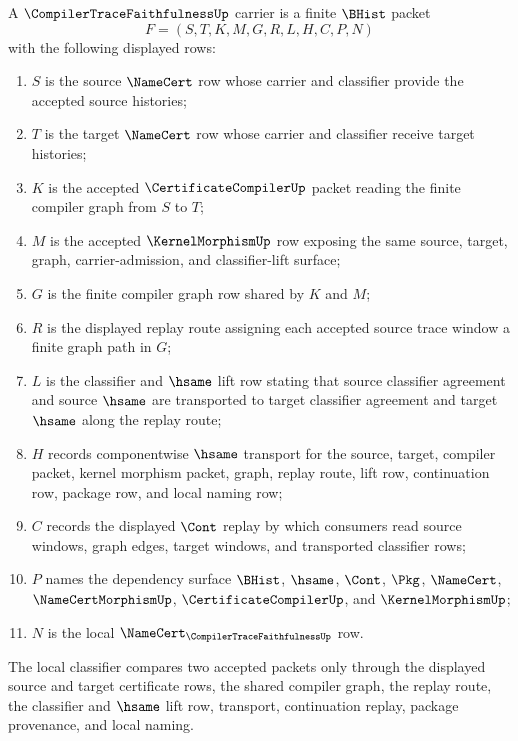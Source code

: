 \begin{definition}
\label{def:compiler-trace-faithfulness-carrier}
A $\CompilerTraceFaithfulnessUp$ carrier is a finite $\BHist$ packet
$$
F=(S,T,K,M,G,R,L,H,C,P,N)
$$
with the following displayed rows:
\begin{enumerate}
\item $S$ is the source $\NameCert$ row whose carrier and classifier provide the accepted source histories;
\item $T$ is the target $\NameCert$ row whose carrier and classifier receive target histories;
\item $K$ is the accepted $\CertificateCompilerUp$ packet reading the finite compiler graph from $S$ to $T$;
\item $M$ is the accepted $\KernelMorphismUp$ row exposing the same source, target, graph, carrier-admission, and classifier-lift surface;
\item $G$ is the finite compiler graph row shared by $K$ and $M$;
\item $R$ is the displayed replay route assigning each accepted source trace window a finite graph path in $G$;
\item $L$ is the classifier and $\hsame$ lift row stating that source classifier agreement and source $\hsame$ are transported to target classifier agreement and target $\hsame$ along the replay route;
\item $H$ records componentwise $\hsame$ transport for the source, target, compiler packet, kernel morphism packet, graph, replay route, lift row, continuation row, package row, and local naming row;
\item $C$ records the displayed $\Cont$ replay by which consumers read source windows, graph edges, target windows, and transported classifier rows;
\item $P$ names the dependency surface $\BHist$, $\hsame$, $\Cont$, $\Pkg$, $\NameCert$, $\NameCertMorphismUp$, $\CertificateCompilerUp$, and $\KernelMorphismUp$;
\item $N$ is the local $\NameCert_{\CompilerTraceFaithfulnessUp}$ row.
\end{enumerate}
The local classifier compares two accepted packets only through the displayed source and target certificate rows, the shared compiler graph, the replay route, the classifier and $\hsame$ lift row, transport, continuation replay, package provenance, and local naming.
\end{definition}


